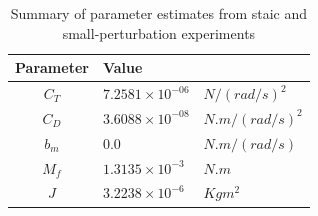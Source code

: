 \begin{table}[H]
    \centering
    \begin{tabular}{c l l}
        \hline \hline
        Parameter & Value & \\ \hline \hline
        $C_T$ & $7.2581 \times 10^{-06}$ & $N/(rad/s)^2$  \\
        $C_D$ & $3.6088 \times 10^{-08}$ & $N.m/(rad/s)^2$ \\
        $b_m$ & $0.0$                    & $N.m/(rad/s)$\\
        $M_f$ & $1.3135 \times 10^{-3}$  & $N.m$\\
        $J$   & $3.2238 \times 10^{-6}$  & $Kg m^2$ \\\hline \hline
    \end{tabular}
    \caption{Summary of parameter estimates from staic and small-perturbation experiments}
\end{table}
